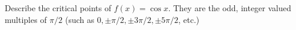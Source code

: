 {Describe the critical points of $f(x) = \cos x$.
}
{They are the odd, integer valued multiples of $\pi/2$ (such as $0,\pm\pi/2, \pm 3\pi/2, \pm5\pi/2$, etc.)
}
